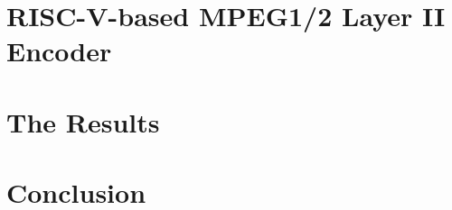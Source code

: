 \documentclass{esda}
\begin{document}
\cleardoublepage
\section{RISC-V-based MPEG1/2 Layer II Encoder}
\label{sec:curr}


\cleardoublepage
\section{The Results}
\label{sec:res}


\cleardoublepage
\section{Conclusion}
\label{sec:conc}


\cleardoublepage
{}

\end{document}
